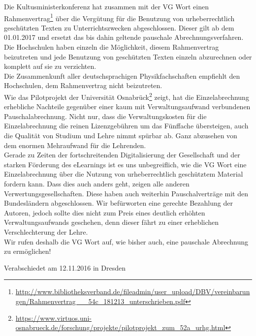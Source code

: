 \documentclass[DIV=calc]{scrartcl}
\begin{document}
   Die Kultusministerkonferenz hat zusammen mit der VG Wort einen Rahmenvertrag\footnote{ \url{http://www.bibliotheksverband.de/fileadmin/user_upload/DBV/vereinbarungen/Rahmenvertrag __54c_181213_unterschrieben.pdf}} über die Vergütung für die Benutzung von urheberrechtlich geschützten Texten zu Unterrichtszwecken abgeschlossen. Dieser gilt ab dem 01.01.2017 und ersetzt das bis dahin geltende pauschale Abrechnungsverfahren. Die Hochschulen haben einzeln die Möglichkeit, diesem Rahmenvertrag beizutreten und jede Benutzung von geschützten Texten einzeln abzurechnen oder komplett auf sie zu verzichten. \\   
Die Zusammenkunft aller deutschsprachigen Physikfachschaften empfiehlt den Hochschulen, dem Rahmenvertrag nicht beizutreten. \\
Wie das Pilotprojekt der Universität Osnabrück\footnote{ \url{https://www.virtuos.uni-osnabrueck.de/forschung/projekte/pilotprojekt_zum_52a_urhg.html}} zeigt, hat die Einzelabrechnung erhebliche Nachteile gegenüber einer kaum mit Verwaltungsaufwand verbundenen Pauschalabrechnung. Nicht nur, dass die Verwaltungskosten für die Einzelabrechnung die reinen Lizenzgebühren um das Fünffache übersteigen, auch die Qualität von Studium und Lehre nimmt spürbar ab. Ganz abzusehen von dem enormen Mehraufwand für die Lehrenden. \\
Gerade zu Zeiten der fortschreitenden Digitalisierung der Gesellschaft und der starken Förderung des eLearnings ist es uns unbegreiflich, wie die VG Wort eine Einzelabrechnung über die Nutzung von urheberrechtlich geschütztem Material fordern kann. Dass dies auch anders geht, zeigen alle anderen Verwertungsgesellschaften. Diese haben auch weiterhin Pauschalverträge mit den Bundesländern abgeschlossen.
Wir befürworten eine gerechte Bezahlung der Autoren, jedoch sollte dies nicht zum Preis eines deutlich erhöhten Verwaltungsaufwands geschehen, denn dieser fährt zu einer erheblichen Verschlechterung der Lehre.  \\
Wir rufen deshalb die VG Wort auf, wie bisher auch, eine pauschale Abrechnung zu ermöglichen!
    
    \vfill
    \begin{flushright}
        Verabschiedet am 12.11.2016 in Dresden
    \end{flushright}
    
    
    
    
\end{document}
